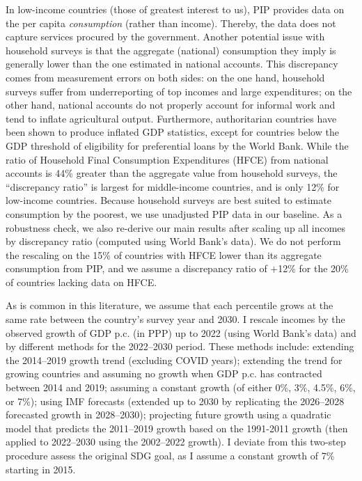 In low-income countries (those of greatest interest to us), PIP provides data on the per capita \textit{consumption} (rather than income). Thereby, the data does not capture services procured by the government. Another potential issue with household surveys is that the aggregate (national) consumption they imply is generally lower than the one estimated in national accounts. This discrepancy comes from measurement errors on both sides: on the one hand, household surveys suffer from underreporting of top incomes and large expenditures; on the other hand, national accounts do not properly account for informal work %
and tend to inflate agricultural output. %
Furthermore, authoritarian countries have been shown to produce inflated GDP statistics, except for countries below the GDP threshold of eligibility for preferential loans by the World Bank. %
While the ratio of Household Final Consumption Expenditures (HFCE) from national accounts is 44\% greater than the aggregate value from household surveys, the ``discrepancy ratio'' is largest for middle-income countries, and is only 12\% for low-income countries. Because household surveys are best suited to estimate consumption by the poorest, we use unadjusted PIP data in our baseline. As a robustness check, we also re-derive our main results after scaling up all incomes by discrepancy ratio (computed using World Bank's data). We do not perform the rescaling on the 15\% of countries with HFCE lower than its aggregate consumption from PIP, and we assume a discrepancy ratio of +12\% for the 20\% of countries lacking data on HFCE. %

As is common in this literature, we assume that each percentile grows at the same rate between the country's survey year and 2030. 
I rescale incomes by the observed growth of GDP p.c. (in PPP) up to 2022 (using World Bank's data) and by different methods for the 2022--2030 period. 
These methods include: extending the 2014--2019 growth trend (excluding COVID years); extending the trend for growing countries and assuming no growth when GDP p.c. has contracted between 2014 and 2019; assuming a constant growth (of either 0\%, 3\%, 4.5\%, 6\%, or 7\%); using IMF forecasts (extended up to 2030 by replicating the 2026--2028 forecasted growth in 2028--2030); projecting future growth using a quadratic model that predicts the 2011--2019 growth based on the 1991-2011 growth (then applied to 2022--2030 using the 2002--2022 growth). I deviate from this two-step procedure assess the original SDG goal, as I assume a constant growth of 7\% starting in 2015.



